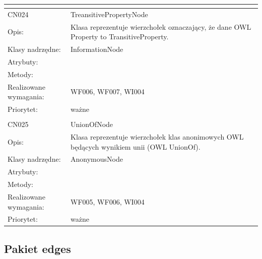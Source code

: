 \begin{center}
\begin{longtable}{|m{3cm}|m{9cm}|}
\multicolumn{2}{c}{} \\
 \hline

CN024 & TreansitivePropertyNode \\ \hline
Opis: & Klasa reprezentuje wierzchołek oznaczający, że dane OWL Property to TransitiveProperty.    \\ \hline
Klasy nadrzędne: & InformationNode     \\ \hline
Atrybuty: & %
 \\ \hline
Metody: & %
  \\ \hline
Realizowane wymagania: & WF006, WF007, WI004 \\ \hline
Priorytet: & ważne  \\ \hline

\multicolumn{2}{c}{} \\
 \hline

CN025 & UnionOfNode \\ \hline
Opis: & Klasa reprezentuje wierzchołek klas anonimowych OWL będących wynikiem unii (OWL UnionOf).    \\ \hline
Klasy nadrzędne: & AnonymousNode     \\ \hline
Atrybuty: & %
 \\ \hline
Metody: & %
  \\ \hline
Realizowane wymagania: & WF005, WF006, WI004 \\ \hline
Priorytet: & ważne  \\ \hline



\end{longtable}

\end{center}

\subsection{Pakiet edges}

